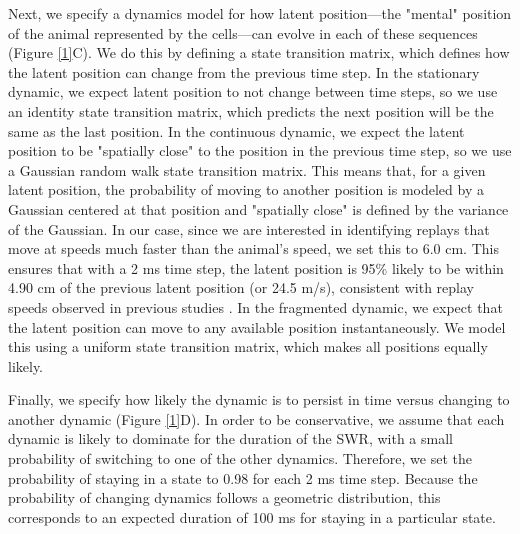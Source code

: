 \documentclass[times, twoside]{zHenriquesLab-StyleBioRxiv}
\begin{document}
Next, we specify a dynamics model for how latent position---the "mental" position of the animal represented by the cells---can evolve in each of these sequences (Figure \ref{1}C). We do this by defining a state transition matrix, which defines how the latent position can change from the previous time step. In the stationary dynamic, we expect latent position to not change between time steps, so we use an identity state transition matrix, which predicts the next position will be the same as the last position. In the continuous dynamic, we expect the latent position to be "spatially close" to the position in the previous time step, so we use a Gaussian random walk state transition matrix. This means that, for a given latent position, the probability of moving to another position is modeled by a Gaussian centered at that position and "spatially close" is defined by the variance of the Gaussian. In our case, since we are interested in identifying replays that move at speeds much faster than the animal's speed, we set this to 6.0 cm. This ensures that with a 2 ms time step, the latent position is 95\% likely to be within 4.90 cm of the previous latent position (or 24.5 m/s), consistent with replay speeds observed in previous studies \cite{DavidsonHippocampalReplayExtended2009, PfeifferAutoassociativedynamicsgeneration2015}. In the fragmented dynamic, we expect that the latent position can move to any available position instantaneously. We model this using a uniform state transition matrix, which makes all positions equally likely.

Finally, we specify how likely the dynamic is to persist in time versus changing to another dynamic (Figure \ref{1}D). In order to be conservative, we assume that each dynamic is likely to dominate for the duration of the SWR, with a small probability of switching to one of the other dynamics. Therefore, we set the probability of staying in a state to 0.98 for each 2 ms time step. Because the probability of changing dynamics follows a geometric distribution, this corresponds to an expected duration of 100 ms for staying in a particular state.
\end{document}
